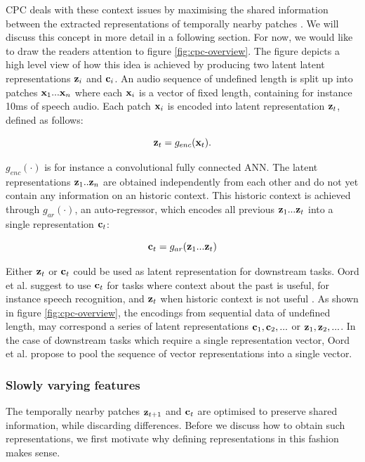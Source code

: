 	CPC deals with these context issues by maximising the shared information between the extracted representations of temporally nearby patches \cite{lowePuttingEndEndtoEnd2020}. We will discuss this concept in more detail in a following section. For now, we would like to draw the readers attention to figure \ref{fig:cpc-overview}. The figure depicts a high level view of how this idea is achieved by producing two latent latent representations $\mathbf{z}_i$ and $\mathbf{c}_i$. An audio sequence of undefined length is split up into patches $\mathbf{x}_1...\mathbf{x}_n$ where each $\mathbf{x}_i$ is a vector of fixed length, containing for instance 10ms of speech audio. Each patch $\mathbf{x}_i$ is encoded into latent representation $\mathbf{z}_t$, defined as follows:
	
	$$
	\mathbf{z}_t = g_{enc}(\mathbf{x}_t) .
	$$
	
	$g_{enc}( \cdot )$ is for instance a convolutional fully connected ANN. The latent representations $\mathbf{z}_1..\mathbf{z}_n$ are obtained independently from each other and do not yet contain any information on an historic context. This historic context is achieved through $g_{ar}( \cdot )$, an auto-regressor, which encodes all previous $\mathbf{z}_1 ... \mathbf{z}_t$ into a single representation $\mathbf{c}_t$:
	
	$$
	\mathbf{c}_t = g_{ar}(\mathbf{z}_1 ... \mathbf{z}_t)
	$$
	
	Either $\mathbf{z}_t$ or $\mathbf{c}_t$ could be used as latent representation for downstream tasks. Oord et al. suggest to use $\mathbf{c}_t$ for tasks where context about the past is useful, for instance speech recognition, and $\mathbf{z}_t$ when historic context is not useful \cite{oordRepresentationLearningContrastive2019}. As shown in figure \ref{fig:cpc-overview}, the encodings from sequential data of undefined length, may correspond a series of latent representations $\mathbf{c}_1, \mathbf{c}_2, ... $ or $\mathbf{z}_1, \mathbf{z}_2, ... $. In the case of downstream tasks which require a single representation vector, Oord et al. propose to pool the sequence of vector representations into a single vector.
	

\subsubsection{Slowly varying features}
	The temporally nearby patches $\mathbf{z}_{t+1}$ and $\mathbf{c}_t$ are optimised to preserve shared information, while discarding differences. Before we discuss how to obtain such representations, we first motivate why defining representations in this fashion makes sense.
	
